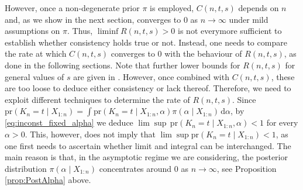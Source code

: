 \documentclass[12pt]{article}
\begin{document}
However, once a non-degenerate prior $\pi$ is employed, %
$C(n,t,s)$ depends on $n$ and, as we show in the next section, converges to 0 as $n\to\infty$ under mild assumptions on $\pi$. Thus, $\liminf R(n,t,s)>0$ is not everymore sufficient to establish whether consistency holds true or not.
Instead, one needs to compare the rate at which $C(n,t,s)$ converges to 0 with the behaviour of $R(n,t,s)$, as done in the following sections.
Note that further lower bounds for $R(n,t,s)$ for general values of $s$ are given in \cite{Miller2014,Yang2019}.
However, once combined with $C(n,t,s)$, these are too loose %
to deduce either consistency or lack thereof. Therefore, we need to exploit different techniques to determine the rate of $R(n,t,s)$.
Since $\text{pr}( K_n = t \mid X_{1:n}) = \int \text{pr}( K_n = t \mid X_{1:n}, \alpha) \pi(\alpha \mid X_{1:n}) \, \mathrm{d}\alpha$, by \eqref{eq:inconst_fixed_alpha} we deduce $\lim \sup \, \text{pr}( K_n = t \mid X_{1:n},\alpha) <1$ for every $\alpha>0$. 
This, however, does not imply that $\lim\sup\text{pr}( K_n = t \mid X_{1:n})<1$, as one first needs to ascertain whether limit and integral can be interchanged. %
The main reason is that, in the asymptotic regime we are considering, the posterior distribution $\pi(\alpha \mid X_{1:n})$ concentrates around $0$ as $n\to\infty$, see Proposition \ref{prop:PostAlpha} above. 
\end{document}
